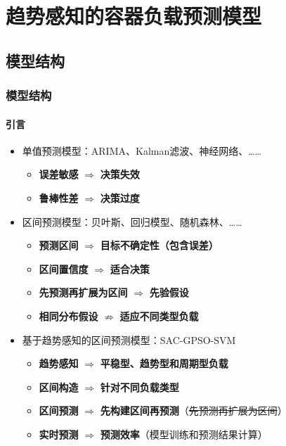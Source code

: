 \section{趋势感知的容器负载预测模型}

\subsection{模型结构}

\begin{frame}
\frametitle{模型结构}
\framesubtitle{引言}
\begin{itemize}
    \item 单值预测模型：ARIMA、Kalman滤波、神经网络、……
    \begin{itemize}
        \item \textbf{误差敏感} $\Rightarrow$ \textbf{决策失效}
        \item \textbf{鲁棒性差} $\Rightarrow$ \textbf{决策过度}
    \end{itemize}
    \item 区间预测模型：贝叶斯、回归模型、随机森林、……
    \begin{itemize}
        \item \textbf{预测区间} $\Rightarrow$ \textbf{目标不确定性（包含误差）}
        \item \textbf{区间置信度} $\Rightarrow$ \textbf{适合决策}
        \item \alert{\textbf{先预测再扩展为区间} $\Rightarrow$ \textbf{先验假设}}
        \item \alert{\textbf{相同分布假设} $\nRightarrow$ \textbf{适应不同类型负载}}
    \end{itemize}
    \item 基于趋势感知的区间预测模型：SAC-GPSO-SVM
    \begin{itemize}
        \item \textbf{趋势感知} $\Rightarrow$ \textbf{平稳型、趋势型和周期型负载}
        \item \textbf{区间构造} $\Rightarrow$ \textbf{针对不同负载类型}
        \item \textbf{区间预测} $\Rightarrow$ \textbf{先构建区间再预测}（\sout{先预测再扩展为区间}）
        \item \textbf{实时预测} $\Rightarrow$ \textbf{预测效率}（模型训练和预测结果计算）
    \end{itemize}
\end{itemize}
\end{frame}

